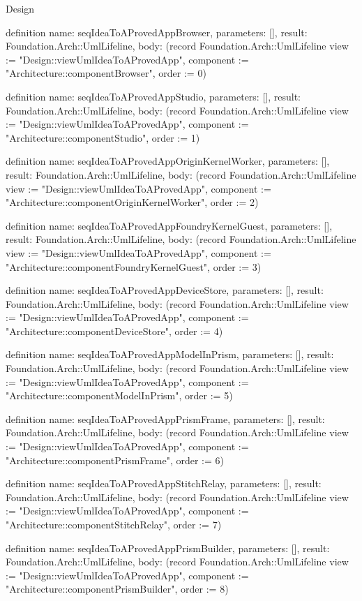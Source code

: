 \begin{lexlean}{Design}
\begin{semanticmodule}
definition{
  name: seqIdeaToAProvedAppBrowser,
  parameters: [],
  result: Foundation.Arch::UmlLifeline,
  body: (record Foundation.Arch::UmlLifeline {view := "Design::viewUmlIdeaToAProvedApp", component := "Architecture::componentBrowser", order := 0})
}

definition{
  name: seqIdeaToAProvedAppStudio,
  parameters: [],
  result: Foundation.Arch::UmlLifeline,
  body: (record Foundation.Arch::UmlLifeline {view := "Design::viewUmlIdeaToAProvedApp", component := "Architecture::componentStudio", order := 1})
}

definition{
  name: seqIdeaToAProvedAppOriginKernelWorker,
  parameters: [],
  result: Foundation.Arch::UmlLifeline,
  body: (record Foundation.Arch::UmlLifeline {view := "Design::viewUmlIdeaToAProvedApp", component := "Architecture::componentOriginKernelWorker", order := 2})
}

definition{
  name: seqIdeaToAProvedAppFoundryKernelGuest,
  parameters: [],
  result: Foundation.Arch::UmlLifeline,
  body: (record Foundation.Arch::UmlLifeline {view := "Design::viewUmlIdeaToAProvedApp", component := "Architecture::componentFoundryKernelGuest", order := 3})
}

definition{
  name: seqIdeaToAProvedAppDeviceStore,
  parameters: [],
  result: Foundation.Arch::UmlLifeline,
  body: (record Foundation.Arch::UmlLifeline {view := "Design::viewUmlIdeaToAProvedApp", component := "Architecture::componentDeviceStore", order := 4})
}

definition{
  name: seqIdeaToAProvedAppModelInPrism,
  parameters: [],
  result: Foundation.Arch::UmlLifeline,
  body: (record Foundation.Arch::UmlLifeline {view := "Design::viewUmlIdeaToAProvedApp", component := "Architecture::componentModelInPrism", order := 5})
}

definition{
  name: seqIdeaToAProvedAppPrismFrame,
  parameters: [],
  result: Foundation.Arch::UmlLifeline,
  body: (record Foundation.Arch::UmlLifeline {view := "Design::viewUmlIdeaToAProvedApp", component := "Architecture::componentPrismFrame", order := 6})
}

definition{
  name: seqIdeaToAProvedAppStitchRelay,
  parameters: [],
  result: Foundation.Arch::UmlLifeline,
  body: (record Foundation.Arch::UmlLifeline {view := "Design::viewUmlIdeaToAProvedApp", component := "Architecture::componentStitchRelay", order := 7})
}

definition{
  name: seqIdeaToAProvedAppPrismBuilder,
  parameters: [],
  result: Foundation.Arch::UmlLifeline,
  body: (record Foundation.Arch::UmlLifeline {view := "Design::viewUmlIdeaToAProvedApp", component := "Architecture::componentPrismBuilder", order := 8})
}


\end{semanticmodule}
\end{lexlean}
